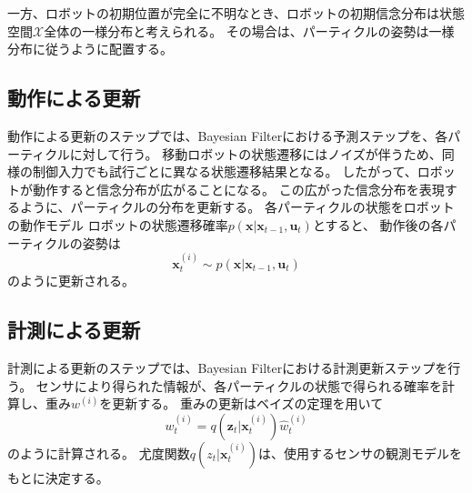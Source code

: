一方、ロボットの初期位置が完全に不明なとき、ロボットの初期信念分布は状態空間$\mathcal{X}$全体の一様分布と考えられる。
その場合は、パーティクルの姿勢は一様分布に従うように配置する。



\subsection{動作による更新}

動作による更新のステップでは、Bayesian Filterにおける予測ステップを、各パーティクルに対して行う。
移動ロボットの状態遷移にはノイズが伴うため、同様の制御入力でも試行ごとに異なる状態遷移結果となる。
したがって、ロボットが動作すると信念分布が広がることになる。
この広がった信念分布を表現するように、パーティクルの分布を更新する。
各パーティクルの状態をロボットの動作モデル
ロボットの状態遷移確率$p(\bm{x} | \bm{x}_{t-1}, \bm{u}_{t})$とすると、
動作後の各パーティクルの姿勢は
\begin{equation}
\label{particle trans prob}
  \bm{x}^{(i)}_{t} \sim p(\bm{x} | \bm{x}_{t-1}, \bm{u}_{t})
\end{equation}
のように更新される。


\subsection{計測による更新}

計測による更新のステップでは、Bayesian Filterにおける計測更新ステップを行う。
センサにより得られた情報が、各パーティクルの状態で得られる確率を計算し、重み$w^{(i)}$を更新する。
重みの更新はベイズの定理を用いて
\begin{equation}
\label{weight}
  w^{(i)}_{t} = q(\bm{z}_{t} | \bm{x}^{(i)}_{t}) \hat{w}^{(i)}_{t}
\end{equation}
のように計算される。
尤度関数$q(z_{t} | \bm{x}^{(i)}_{t})$は、使用するセンサの観測モデルをもとに決定する。

